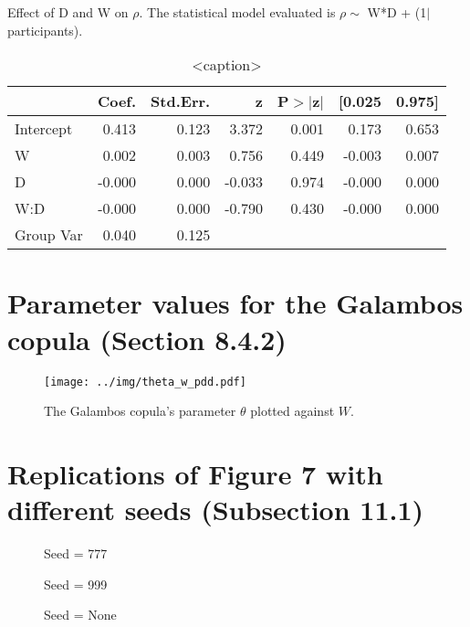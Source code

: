\documentclass{article}
\begin{document}
\begin{table}[htbp]
    \begin{center}
        \caption{Effect of D and W on $\rho$. The statistical model evaluated is $\rho \sim$  W*D + (1$|$participants).}
        \begin{tabular}{lrrrrrr}
        \hline
                  &  Coef. & Std.Err. &      z & P$> |$z$|$ & [0.025 & 0.975]  \\
        \hline
        Intercept &  0.413 &    0.123 &  3.372 &       0.001 &  0.173 &  0.653  \\
        W         &  0.002 &    0.003 &  0.756 &       0.449 & -0.003 &  0.007  \\
        D         & -0.000 &    0.000 & -0.033 &       0.974 & -0.000 &  0.000  \\
        W:D       & -0.000 &    0.000 & -0.790 &       0.430 & -0.000 &  0.000  \\
        Group Var &  0.040 &    0.125 &        &             &        &         \\
        \hline
        \end{tabular}
        \end{center}
        
    \caption{<caption>}
    \label{<label>}
\end{table}

\section{Parameter values for the Galambos copula (Section 8.4.2)}
\begin{figure}[htbp]
	\centering
	\texttt{[image: ../img/theta\_w\_pdd.pdf]}
	\caption{The Galambos copula's parameter $\theta$ plotted against $W$.}
	\label{}
\end{figure}

\section{Replications of Figure 7 with different seeds (Subsection 11.1)}

\begin{figure}[htbp]
    \centering
    \caption{Seed = 777}
\end{figure}
\begin{figure}[htbp]
    \centering
    \caption{Seed = 999}
\end{figure}
\begin{figure}[htbp]
    \centering
    \caption{Seed = None}
\end{figure}
\end{document}
